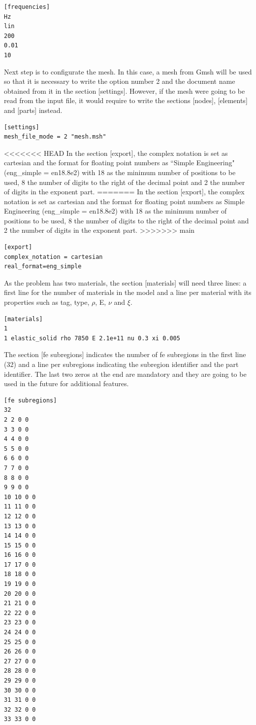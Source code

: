 \documentclass[a4]{article}
\begin{document}
\begin{Verbatim}
[frequencies]
Hz
lin
200
0.01
10
\end{Verbatim}

Next step is to configurate the mesh. In this case, a mesh from Gmsh will be used so that it is necessary to write the option number 2 and the document name obtained from it in the section [settings]. However, if the mesh were going to be read from the input file, it would require to write the sections [nodes], [elements] and [parts] instead.

\begin{Verbatim}	
[settings]
mesh_file_mode = 2 "mesh.msh"
\end{Verbatim}

<<<<<<< HEAD
In the section [export], the complex notation is set as cartesian and the format for floating point numbers as ``Simple Engineering" (eng\_simple = en18.8e2) with 18 as the minimum number of positions to be used, 8 the number of digits to the right of the decimal point and 2 the number of digits in the exponent part. 
=======
In the section [export], the complex notation is set as cartesian and the format for floating point numbers as Simple Engineering (eng\_simple = en18.8e2) with 18 as the minimum number of positions to be used, 8 the number of digits to the right of the decimal point and 2 the number of digits in the exponent part. 
>>>>>>> main

\begin{Verbatim}
[export]
complex_notation = cartesian
real_format=eng_simple
\end{Verbatim}

As the problem has two materials, the section [materials] will need three lines: a first line for the number of materials in the model and a line per material with its properties such as tag, type, $\rho$, E, $\nu$ and $ \xi $.

\begin{Verbatim}
[materials]
1
1 elastic_solid rho 7850 E 2.1e+11 nu 0.3 xi 0.005
\end{Verbatim}

The section [fe subregions] indicates the number of fe subregions in the first line (32) and a line per subregions indicating the subregion identifier and the part identifier. The last two zeros at the end are mandatory and they are going to be used in the future for additional features.

\begin{Verbatim}
[fe subregions]
32
2 2 0 0
3 3 0 0
4 4 0 0
5 5 0 0
6 6 0 0
7 7 0 0
8 8 0 0
9 9 0 0
10 10 0 0
11 11 0 0
12 12 0 0
13 13 0 0
14 14 0 0
15 15 0 0
16 16 0 0
17 17 0 0
18 18 0 0
19 19 0 0
20 20 0 0
21 21 0 0
22 22 0 0
23 23 0 0
24 24 0 0
25 25 0 0
26 26 0 0
27 27 0 0
28 28 0 0
29 29 0 0
30 30 0 0
31 31 0 0
32 32 0 0
33 33 0 0
\end{Verbatim}
\end{document}
